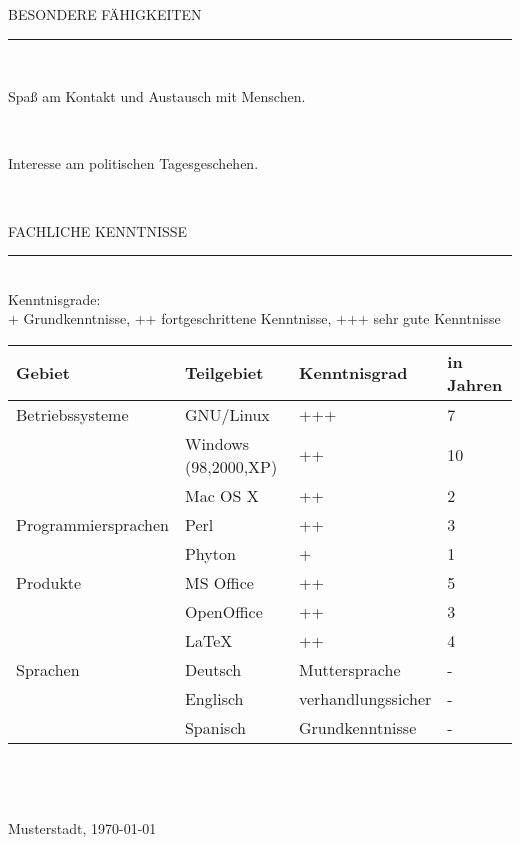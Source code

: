 \documentclass[a4paper,12pt]{scrartcl}
\newlength{\defbaselineskip}
\newcommand{\erkabstand}{\setlength{\baselineskip}{0.2\defbaselineskip}}
\newcommand{\nz}{~\\[\medskipamount]}
\newcommand{\nzb}{~\\[\bigskipamount]}
\newcommand{\zeile}[2]{\hspace*{0.5cm}\parbox[t]{4cm}{#1}\hspace*{0.5cm}
\parbox[t]{10cm}{#2}}
\begin{document}
BESONDERE F\"{A}HIGKEITEN\\\erkabstand \rule{\textwidth}{0.5pt}\nzb
 
\zeile{}{Spa\ss{} am Kontakt und Austausch mit Menschen. }\nz
\zeile{}{Interesse am politischen Tagesgeschehen.}\nz
 
\newpage
 
FACHLICHE KENNTNISSE\\\erkabstand \rule{\textwidth}{0.5pt}\nzb
 
Kenntnisgrade:\nz + Grundkenntnisse, ++ fortgeschrittene Kenntnisse,
+++ sehr gute Kenntnisse\nz
 
\begin{tabular}{|l|l|l|l|}
\hline
\textbf{Gebiet} & \textbf{Teilgebiet} & \textbf{Kenntnisgrad} & \textbf{in Jahren} \\
\hline
 
\hline
Betriebssysteme & GNU/Linux & +++ & 7 \\ \hline
& Windows (98,2000,XP) & ++ & 10 \\ \hline
& Mac OS X & ++ & 2 \\ \hline
\hline
Programmiersprachen & Perl & ++ & 3 \\ \hline
& Phyton & + & 1 \\ \hline
\hline
Produkte & MS Office & ++ & 5 \\ \hline
& OpenOffice & ++ & 3 \\ \hline
& \LaTeX & ++ & 4 \\ \hline
\hline
Sprachen & Deutsch & Muttersprache & -\\ \hline
& Englisch & verhandlungssicher & - \\ \hline
& Spanisch & Grundkenntnisse & - \\ \hline
 
 
\end{tabular}
\nzb
 
\nzb \nzb
 
 
Musterstadt, \today
 
\end{document}
